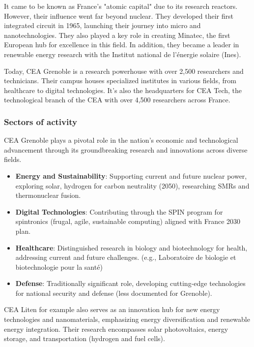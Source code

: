 \medskip

It came to be known as France's "atomic capital" due to its research reactors.  However, their influence went far beyond
 nuclear.  They developed their first integrated circuit in 1965, launching their journey into micro and nanotechnologies.  
 They also played a key role in creating Minatec, the first European hub for excellence in this field.  In addition, they 
 became a leader in renewable energy research with the Institut national de l'énergie solaire (Ines).

\medskip

Today, CEA Grenoble is a research powerhouse with over 2,500 researchers and technicians.  Their campus houses specialized
 institutes in various fields, from healthcare to digital technologies.  It's also the headquarters for CEA Tech, the
  technological branch of the CEA with over 4,500 researchers across France.

\medskip

\subsubsection{Sectors of activity}

CEA Grenoble plays a pivotal role in the nation's economic and technological 
advancement through its groundbreaking research and innovations across diverse fields.

\begin{itemize}
  \item \textbf{Energy and Sustainability}: Supporting current and future nuclear power, exploring solar, hydrogen for carbon
   neutrality (2050), researching SMRs and thermonuclear fusion.
  \item \textbf{Digital Technologies}: Contributing through the SPIN program for spintronics (frugal, agile, sustainable computing)
   aligned with France 2030 plan.
  \item \textbf{Healthcare}: Distinguished research in biology and biotechnology for health, addressing current and future challenges.
   (e.g., Laboratoire de biologie et biotechnologie pour la santé)
  \item \textbf{Defense}: Traditionally significant role, developing cutting-edge technologies for national security and defense 
  (less documented for Grenoble).
\end{itemize}

CEA Liten for example also serves as an innovation hub for new energy technologies and nanomaterials, emphasizing energy diversification
 and renewable energy integration. Their research encompasses solar photovoltaics, energy storage, and transportation (hydrogen and fuel
  cells).


